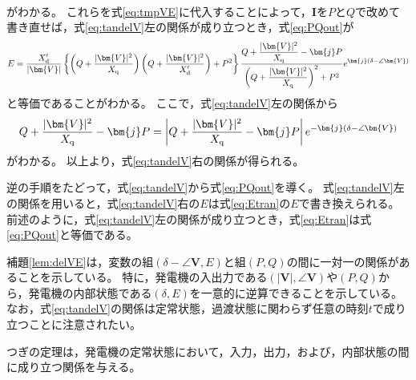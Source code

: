 \documentclass[tombow,dvipdfmx]{corona-a5-1.1}
\begin{document}
\begin{証明}
\begin{align*}
\end{align*}
がわかる。
これらを式\ref{eq:tmpVE}に代入することによって，$\bm{I}$を$P$と$Q$で改めて書き直せば，式\ref{eq:tandelV}左の関係が成り立つとき，式\ref{eq:PQout}が
\begin{align}\label{eq:Etran}
E=
\frac{X_{\rm d}'}{|\bm{V}| } 
\left\{
\left(Q + \frac{|\bm{V}|^2}{X_{\rm q}} \right) \left(Q + \frac{|\bm{V}|^2}{X_{\rm d}'} \right) +P^2
\right\}
\frac{  Q + \frac{|\bm{V}|^2}{X_{\rm q}} - \bm{j} P }
{   \left( Q + \frac{|\bm{V}|^2}{X_{\rm q}} \right)^2 + P^2   }
e^{\bm{j}(\delta - \angle \bm{V})}
\end{align}
と等価であることがわかる。
ここで，式\ref{eq:tandelV}左の関係から
\begin{align*}
Q + \frac{|\bm{V}|^2}{X_{\rm q}} - \bm{j} P
= 
\left|Q + \frac{|\bm{V}|^2}{X_{\rm q}} - \bm{j} P \right|
e^{-\bm{j}(\delta - \angle \bm{V})}
\end{align*}
がわかる。
以上より，式\ref{eq:tandelV}右の関係が得られる。

逆の手順をたどって，式\ref{eq:tandelV}から式\ref{eq:PQout}を導く。
式\ref{eq:tandelV}左の関係を用いると，式\ref{eq:tandelV}右の$E$は式\ref{eq:Etran}の$E$で書き換えられる。
前述のように，式\ref{eq:tandelV}左の関係が成り立つとき，式\ref{eq:Etran}は式\ref{eq:PQout}と等価である。
\end{証明}

補題\ref{lem:delVE}は，変数の組$(\delta - \angle \bm{V},E)$と組$(P,Q)$の間に一対一の関係があることを示している。
特に，発電機の入出力である$(|\bm{V}|,\angle \bm{V})$や$(P,Q)$から，発電機の内部状態である$(\delta,E)$を一意的に逆算できることを示している。
なお，式\ref{eq:tandelV}の関係は定常状態，過渡状態に関わらず任意の時刻$t$で成り立つことに注意されたい。

つぎの定理は，発電機の定常状態において，入力，出力，および，内部状態の間に成り立つ関係を与える。
\end{document}
